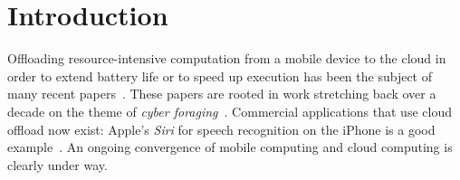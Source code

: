 \section{Introduction}
\label{sec:intro}

Offloading resource-intensive computation from a mobile device to the
cloud in order to extend battery life or to speed up execution has
been the subject of many recent papers~\cite{Chun2011}. These
papers are rooted in work stretching back over a decade on the theme
of {\em cyber foraging}~\cite{Balan2002,Satya2001}.  Commercial
applications that use cloud offload now exist: Apple's {\em Siri} for
speech recognition on the iPhone is a good example~\cite{SiriURL}.  An
ongoing convergence of mobile computing and cloud computing is clearly
under way.
